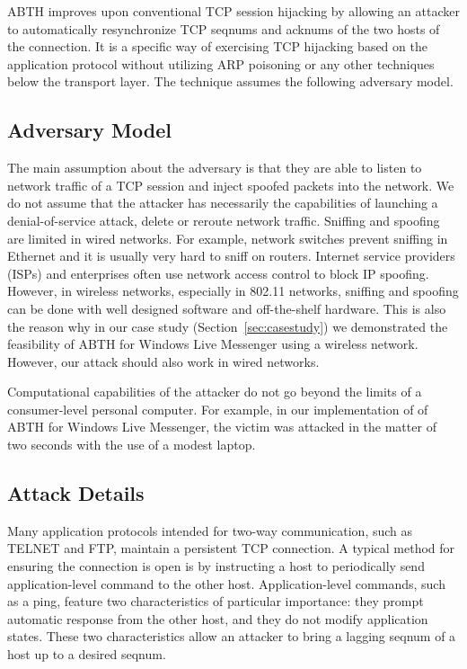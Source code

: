 \documentclass{sig-alternate}
\begin{document}
ABTH improves upon conventional TCP session hijacking by allowing an attacker to automatically resynchronize TCP seqnums and acknums of the two hosts of the connection.
It is a specific way of exercising TCP hijacking based on the application protocol without utilizing ARP poisoning or any other techniques below the transport layer.
The technique assumes the following adversary model.


\subsection{Adversary Model}
\label{sec:adversarymodel}

The main assumption about the adversary is that they are able to listen to network traffic of a TCP session and inject spoofed packets into the network.
We do not assume that the attacker has necessarily the capabilities of launching a denial-of-service attack, delete or reroute network traffic.
Sniffing and spoofing are limited in wired networks.
For example, network switches prevent sniffing in Ethernet and it is usually very hard to sniff on routers.
Internet service providers (ISPs) and enterprises often use network access control to block IP spoofing.
However, in wireless networks, especially in 802.11 networks, sniffing and spoofing can be done with well designed software and off-the-shelf hardware.
This is also the reason why in our case study (Section~\ref{sec:casestudy}) we demonstrated the feasibility of ABTH for Windows Live Messenger using a wireless network.
However, our attack should also work in wired networks.

Computational capabilities of the attacker do not go beyond the limits of a consumer-level personal computer.
For example, in our implementation of of ABTH for Windows Live Messenger, the victim was attacked in the matter of two seconds with the use of a modest laptop.

\subsection{Attack Details}

Many application protocols intended for two-way communication, such as TELNET and FTP, maintain a persistent TCP connection.
A typical method for ensuring the connection is open is by instructing a host to periodically send application-level command to the other host.
Application-level commands, such as a ping, feature two characteristics of particular importance: they prompt automatic response from the other host, and they do not modify application states.
These two characteristics allow an attacker to bring a lagging seqnum of a host up to a desired seqnum.
\end{document}
